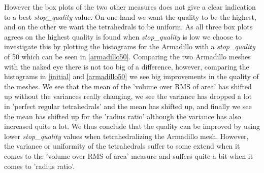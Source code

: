 However the box plots of the two other measures does not give a clear indication to a best \textit{stop\_quality} value. On one hand we want the quality to be the highest, and on the other we want the tetrahedrals to be uniform. As all three box plots agrees on the highest quality is found when \textit{stop\_quality} is low we choose to investigate this by plotting the histograms for the Armadillo with a \textit{stop\_quality} of 50 which can be seen in \autoref{armadillo50}. 
Comparing the two Armadillo meshes with the naked eye there is not too big of a difference, however, comparing the histograms in \autoref{initial} and \autoref{armadillo50} we see big improvements in the quality of the meshes. We see that the mean of the 'volume over RMS of area' has shifted up without the variances really changing, we see the variance has dropped a lot in 'perfect regular tetrahedrals' and the mean has shifted up, and finally we see the mean has shifted up for the 'radius ratio' although the variance has also increased quite a lot. We thus conclude that the quality can be improved by using lower \textit{stop\_quality} values when tetrahedralizing the Armadillo mesh. However, the variance or uniformity of the tetrahedrals suffer to some extend when it comes to the 'volume over RMS of area' measure and suffers quite a bit when it comes to 'radius ratio'. 

